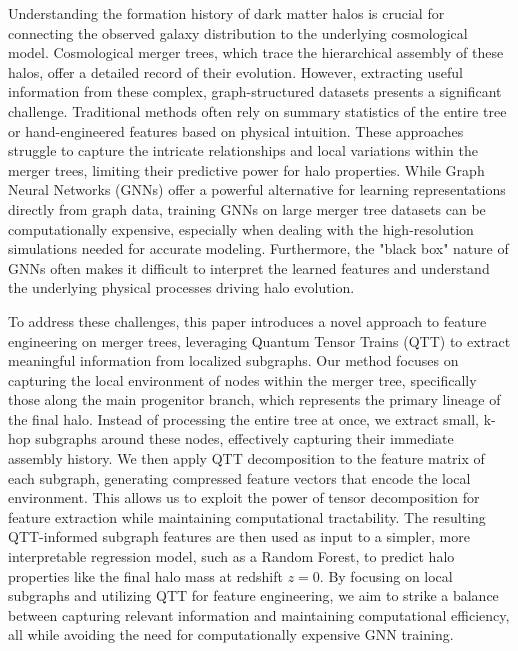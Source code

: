 \documentclass[twocolumn]{aastex631}
\begin{document}
Understanding the formation history of dark matter halos is crucial for connecting the observed galaxy distribution to the underlying cosmological model. Cosmological merger trees, which trace the hierarchical assembly of these halos, offer a detailed record of their evolution. However, extracting useful information from these complex, graph-structured datasets presents a significant challenge. Traditional methods often rely on summary statistics of the entire tree or hand-engineered features based on physical intuition. These approaches struggle to capture the intricate relationships and local variations within the merger trees, limiting their predictive power for halo properties. While Graph Neural Networks (GNNs) offer a powerful alternative for learning representations directly from graph data, training GNNs on large merger tree datasets can be computationally expensive, especially when dealing with the high-resolution simulations needed for accurate modeling. Furthermore, the "black box" nature of GNNs often makes it difficult to interpret the learned features and understand the underlying physical processes driving halo evolution.

To address these challenges, this paper introduces a novel approach to feature engineering on merger trees, leveraging Quantum Tensor Trains (QTT) to extract meaningful information from localized subgraphs. Our method focuses on capturing the local environment of nodes within the merger tree, specifically those along the main progenitor branch, which represents the primary lineage of the final halo. Instead of processing the entire tree at once, we extract small, k-hop subgraphs around these nodes, effectively capturing their immediate assembly history. We then apply QTT decomposition to the feature matrix of each subgraph, generating compressed feature vectors that encode the local environment. This allows us to exploit the power of tensor decomposition for feature extraction while maintaining computational tractability. The resulting QTT-informed subgraph features are then used as input to a simpler, more interpretable regression model, such as a Random Forest, to predict halo properties like the final halo mass at redshift \(z=0\). By focusing on local subgraphs and utilizing QTT for feature engineering, we aim to strike a balance between capturing relevant information and maintaining computational efficiency, all while avoiding the need for computationally expensive GNN training.
\end{document}
